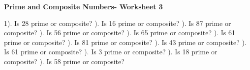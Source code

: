 \documentclass{article}%
\begin{document}
\newline%
\newline%
\pagebreak%
\large%
\begin{center}%
\textbf{Prime and Composite Numbers- Worksheet 3}%
\newline%
\newline%
\newline%
\end{center} \normalsize%
1). Is 28 prime or composite?%
\newline%
\newline%
). Is 16 prime or composite?%
\newline%
\newline%
). Is 87 prime or composite?%
\newline%
\newline%
). Is 56 prime or composite?%
\newline%
\newline%
). Is 65 prime or composite?%
\newline%
\newline%
). Is 61 prime or composite?%
\newline%
\newline%
). Is 81 prime or composite?%
\newline%
\newline%
). Is 43 prime or composite?%
\newline%
\newline%
). Is 61 prime or composite?%
\newline%
\newline%
). Is 3 prime or composite?%
\newline%
\newline%
). Is 18 prime or composite?%
\newline%
\newline%
). Is 58 prime or composite?%
\newline%
\newline%
\newline%
\end{document}
